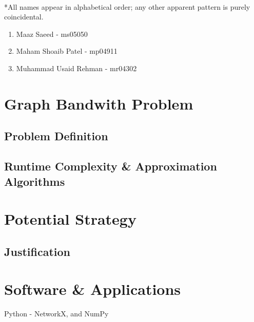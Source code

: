\documentclass[answers]{exam}
\begin{document}
\paragraph{}
*All names appear in alphabetical order; any other apparent pattern is purely coincidental.
\begin{enumerate}
    \item Maaz Saeed - ms05050
    \item Maham Shoaib Patel - mp04911
    \item Muhammad Usaid Rehman - mr04302
\end{enumerate}

\section{Graph Bandwith Problem}


\subsection{Problem Definition}
\subsection{Runtime Complexity \& Approximation Algorithms}

\section{Potential Strategy}

\subsection{Justification}

\section{Software \& Applications}
Python - NetworkX, and NumPy
\end{document}
